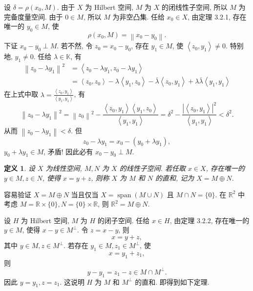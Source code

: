 \documentclass[openany]{ctexbook}
\makeatletter
\theoremstyle{kaiti}
\newtheorem{definition}{定义}[section]
\theoremstyle{normal}
\renewenvironment{proof}[1][\proofname]{\par
    \pushQED{\qed}%
    \normalfont \topsep6\p@\@plus6\p@\relax
    \trivlist
    \item\relax
    {\heiti #1}\hspace{2\labelsep}\ignorespaces
  }{%
    \popQED\endtrivlist\@endpefalse
  }
\makeatother
\begin{document}
\begin{proof}
设 $\delta=\rho\left(x_0, M\right)$. 由于 $X$ 为 Hilbert 空间, $M$ 为 $X$ 的闭线性子空间, 所以 $M$ 为完备度量空间. 由于 $0 \in M$, 所以 $M$ 为非空凸集. 任给 $x_0 \in X$, 由定理 3.2.1, 存在唯一的 $y_0 \in M$, 使
$$
\rho\left(x_0, M\right)=\left\|x_0-y_0\right\|.
$$
下证 $x_0-y_0 \perp M$. 若不然, 令 $z_0=x_0-y_0$, 存在 $y_1 \in M$, 使 $\left\langle z_0, y_1\right\rangle \neq 0$. 特别地, $y_1 \neq 0$. 任给 $\lambda \in \mathbb{K}$, 有
$$
  \begin{aligned}
    \left\|z_0-\lambda y_1\right\|^2 &=\left\langle z_0-\lambda y_1, z_0-\lambda y_1\right\rangle \\
    &=\left\langle z_0, z_0\right\rangle-\lambda\left\langle y_1, z_0\right\rangle-\bar{\lambda}\left\langle z_0, y_1\right\rangle+\lambda \bar{\lambda}\left\langle y_1, y_1\right\rangle
  \end{aligned}
$$
在上式中取 $\lambda=\frac{\left\langle z_0, y_1\right\rangle}{\left\langle y_1, y_1\right\rangle}$, 有
$$
\left\|z_0-\lambda y_1\right\|^2=\left\|z_0\right\|^2-\frac{\left\langle z_0, y_1\right\rangle\left\langle y_1, z_0\right\rangle}{\left\langle y_1, y_1\right\rangle}=\delta^2-\frac{\left|\left\langle z_0, y_1\right\rangle\right|^2}{\left\langle y_1, y_1\right\rangle}<\delta^2.
$$
从而 $\left\|z_0-\lambda y_1\right\|<\delta$. 但
$$
z_0-\lambda y_1=x_0-\left(y_0+\lambda y_1\right),
$$
$y_0+\lambda y_1 \in M$, 矛盾! 因此必有 $x_0-y_0 \perp M$.
\end{proof}

\begin{definition}
设 $X$ 为线性空间, $M, N$ 为 $X$ 的线性子空间. 若任取 $x \in X$, 存在唯一的 $y \in M, z \in N$, 使得 $x=y+z$, 则称 $X$ 为 $M$ 和 $N$ 的直和, 记为 $X=M \oplus N$.
\end{definition}

容易验证 $X=M \oplus N$ 当且仅当 $X=\operatorname{span}(M \cup N)$ 且 $M \cap N=\{0\}$. 在 $\mathbb{R}^2$ 中考虑 $M=\mathbb{R} \times\{0\}, N=\{0\} \times \mathbb{R}$, 则 $\mathbb{R}^2=M \oplus N$.

设 $H$ 为 Hilbert 空间, $M$ 为 $H$ 的闭子空间. 任给 $x \in H$, 由定理 3.2.2, 存在唯一的 $y \in M$, 使得 $x-y \in M^{\perp}$. 令 $z=x-y$, 则
\begin{equation}
  x=y+z,
\end{equation}
其中 $y \in M, z \in M^{\perp}$. 若存在 $y_1 \in M, z_1 \in M^{\perp}$, 使
$$
x=y_1+z_1,
$$
则
$$
y-y_1=z_1-z \in M \cap M^{\perp}.
$$
因此 $y=y_1, z=z_1$. 这说明 $H$ 为 $M$ 和 $M^{\perp}$ 的直和. 即得到如下定理.
\end{document}
